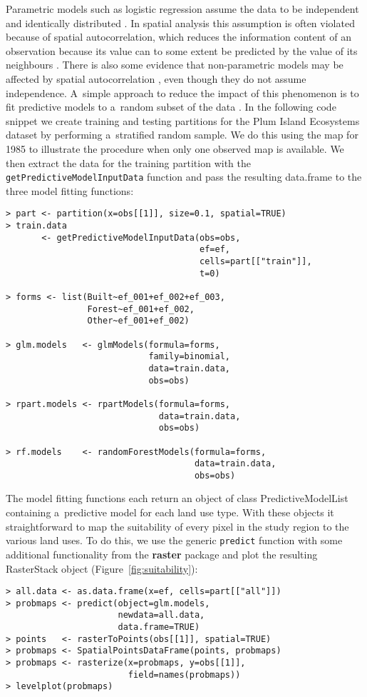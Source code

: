 \documentclass[gmdd, online, hvmath]{copernicus}
\begin{document}
Parametric models such as logistic regression assume the data to be independent and identically distributed \citep{overmars2003}. In spatial analysis this assumption is often violated because of spatial autocorrelation, which reduces the information content of an observation because its value can to some extent be predicted by the value of its neighbours \citep{beale2010}. There is also some evidence that non-parametric models may be affected by spatial autocorrelation \citet{mascaro2014}, even though they do not assume independence. A~simple approach to reduce the impact of this phenomenon is to fit predictive models to a~random subset of the data \citep[e.g.][]{verburg2002,wassenaar2007,echeverria2008}. In the following code snippet we create training and testing partitions for the Plum Island Ecosystems dataset by performing a~stratified random sample. We do this using the map for 1985 to illustrate the procedure when only one observed map is available. We then extract the data for the training partition with the \texttt{getPredictiveModelInputData} function and pass the resulting data.frame to the three model fitting functions:
\begin{verbatim}
> part <- partition(x=obs[[1]], size=0.1, spatial=TRUE) 
> train.data 
       <- getPredictiveModelInputData(obs=obs, 
                                      ef=ef, 
                                      cells=part[["train"]], 
                                      t=0) 

> forms <- list(Built~ef_001+ef_002+ef_003, 
                Forest~ef_001+ef_002, 
                Other~ef_001+ef_002) 

> glm.models   <- glmModels(formula=forms, 
                            family=binomial, 
                            data=train.data, 
                            obs=obs) 

> rpart.models <- rpartModels(formula=forms, 
                              data=train.data, 
                              obs=obs) 

> rf.models    <- randomForestModels(formula=forms, 
                                     data=train.data, 
                                     obs=obs)
\end{verbatim}\hack{\noindent}The model fitting functions each return an object of class PredictiveModelList containing a~predictive model for each land use type. With these objects it straightforward to map the suitability of every pixel in the study region to the various land uses. To do this, we use the generic \texttt{predict} function with some additional functionality from the \textbf{raster} package and plot the resulting RasterStack object (Figure~\ref{fig:suitability}):
\begin{verbatim}
> all.data <- as.data.frame(x=ef, cells=part[["all"]]) 
> probmaps <- predict(object=glm.models, 
                      newdata=all.data, 
                      data.frame=TRUE) 
> points   <- rasterToPoints(obs[[1]], spatial=TRUE) 
> probmaps <- SpatialPointsDataFrame(points, probmaps) 
> probmaps <- rasterize(x=probmaps, y=obs[[1]], 
                        field=names(probmaps)) 
> levelplot(probmaps)
\end{verbatim}
\end{document}
